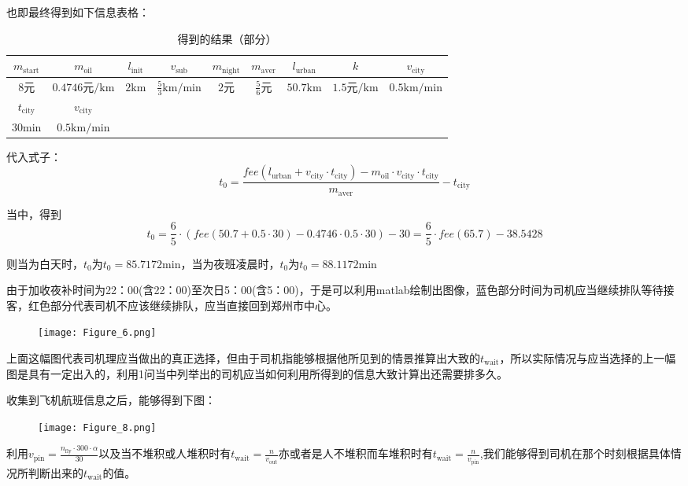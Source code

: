 \documentclass[withoutpreface,bwprint]{cumcmthesis} %
\begin{document}
也即最终得到如下信息表格：\par
\begin{table}[!htbp]
	\caption[标签名]{得到的结果（部分）}
	\begin{tabular}{c|c|c|c|c|c|c|c|c}
		\toprule[1.5pt]
		$m_{\mathrm{start}}$ & $m_{\mathrm{oil}}$       & $l_{\mathrm{init}}$ & $v_{\mathrm{sub}}$            & $m_{\mathrm{night}}$ & $m_{\mathrm{aver}}$ & $l_{\mathrm{urban}}$ & $k$                    & $v_{\mathrm{city}}$  \\
		\midrule[1pt]
		8元                  & $0.4746$元$\mathrm{/km}$ & $2\mathrm{km}$      & $ \frac{5}{3}\mathrm{km/min}$ & $2$元                & $\frac{5}{6}$元     & $50.7\mathrm{km}$    & $ 1.5$元$\mathrm{/km}$ & $0.5\mathrm{km/min}$ \\
		\bottomrule[1.5pt]
		$t_{\mathrm{city}}$  & $v_{\mathrm{city}}$      &                     &                               &                      &                     &                      &                        &                      \\
		\midrule[1pt]
		$30\mathrm{min}$     & $0.5\mathrm{km/min} $    &                     &                               &                      &                     &                      &                        &                      \\
		\bottomrule[1.5pt]
	\end{tabular}
\end{table}
代入式子：
$$
	t_0=  \frac{fee(l_{\mathrm{urban}}+v_{\mathrm{city}} \cdot t_{\mathrm{city}})-m_{\mathrm{oil}}\cdot v_{\mathrm{city}} \cdot t_{\mathrm{city}}}{m_{\mathrm{aver}}} -t_{\mathrm{city}}
$$\par
当中，得到
$$
	t_0=  \frac{6}{5}\cdot(fee(50.7+0.5 \cdot 30)-0.4746\cdot 0.5 \cdot 30) -30= \frac{6}{5}\cdot fee(65.7)-38.5428
$$\par
则当为白天时，$t_0$为$t_0=85.7172\mathrm{min}$，当为夜班凌晨时，$t_0$为$t_0=88.1172\mathrm{min}$\par
由于加收夜补时间为22：00(含22：00)至次日5：00(含5：00)，于是可以利用matlab绘制出图像，蓝色部分时间为司机应当继续排队等待接客，红色部分代表司机不应该继续排队，应当直接回到郑州市中心。\par
\begin{figure}[!h]
	\centering
	\texttt{[image: Figure\_6.png]}
	\caption{}
\end{figure}
上面这幅图代表司机理应当做出的真正选择，但由于司机指能够根据他所见到的情景推算出大致的$t_{\mathrm{wait}}$，所以实际情况与应当选择的上一幅图是具有一定出入的，利用1问当中列举出的司机应当如何利用所得到的信息大致计算出还需要排多久。\par
收集到飞机航班信息之后，能够得到下图：\par \newpage
\begin{figure}[!h]
	\centering
	\texttt{[image: Figure\_8.png]}
	\caption{}
\end{figure}
利用$v_{\mathrm{pin}}=\frac{n_{\mathrm{fly}}\cdot 300 \cdot \alpha}{30}$以及当不堆积或人堆积时有$t_{\mathrm{wait}}=\frac{n}{v_{\mathrm{out}}}$亦或者是人不堆积而车堆积时有$t_{\mathrm{wait}}=\frac{n}{v_{\mathrm{pin}}}$,我们能够得到司机在那个时刻根据具体情况所判断出来的$t_{\mathrm{wait}}$的值。\par
\end{document}
